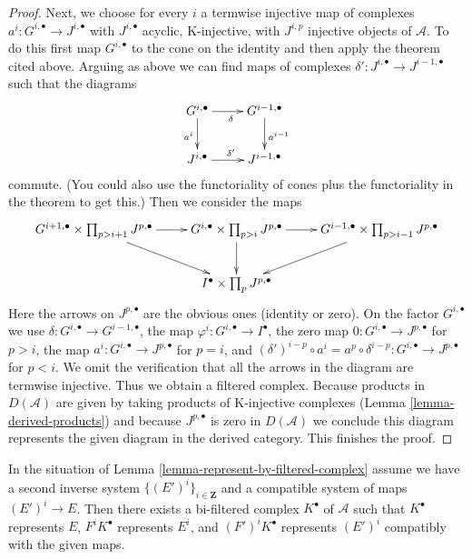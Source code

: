 \begin{proof}
\medskip\noindent
Next, we choose for every $i$ a termwise injective map of complexes
$a^i : G^{i, \bullet} \to J^{i, \bullet}$ with $J^{i, \bullet}$
acyclic, K-injective, with $J^{i, p}$ injective objects of $\mathcal{A}$.
To do this first map $G^{i, \bullet}$ to the cone on the identity
and then apply the theorem cited above.
Arguing as above we can find maps of complexes
$\delta' : J^{i, \bullet} \to J^{i - 1, \bullet}$ such that the diagrams
$$
\xymatrix{
G^{i, \bullet} \ar[r]_\delta \ar[d]_{a^i} &
G^{i - 1, \bullet} \ar[d]^{a^{i - 1}} \\
J^{i, \bullet} \ar[r]^{\delta'} &
J^{i - 1, \bullet}
}
$$
commute. (You could also use the functoriality of cones plus the
functoriality in the theorem to get this.)
Then we consider the maps
$$
\xymatrix{
G^{i + 1, \bullet} \times \prod\nolimits_{p > i + 1} J^{p, \bullet}
\ar[r] \ar[rd] &
G^{i, \bullet} \times \prod\nolimits_{p > i} J^{p, \bullet}
\ar[r] \ar[d] &
G^{i - 1, \bullet} \times \prod\nolimits_{p > i - 1} J^{p, \bullet}
\ar[ld] \\
& I^\bullet \times \prod\nolimits_p J^{p, \bullet}
}
$$
Here the arrows on $J^{p, \bullet}$ are the obvious ones
(identity or zero). On the factor $G^{i, \bullet}$ we use
$\delta : G^{i, \bullet} \to G^{i - 1, \bullet}$, the map
$\varphi^i : G^{i, \bullet} \to I^\bullet$, the zero map
$0 : G^{i, \bullet} \to J^{p, \bullet}$ for $p > i$, the map
$a^i : G^{i, \bullet} \to J^{p, \bullet}$ for $p = i$, and
$(\delta')^{i - p} \circ a^i = a^p \circ \delta^{i - p} :
G^{i, \bullet} \to J^{p, \bullet}$ for $p < i$.
We omit the verification that all the arrows
in the diagram are termwise injective. Thus we obtain a filtered
complex. Because products in $D(\mathcal{A})$ are given by
taking products of K-injective complexes
(Lemma \ref{lemma-derived-products})
and because $J^{p, \bullet}$ is zero in $D(\mathcal{A})$
we conclude this diagram represents the given diagram in the derived
category. This finishes the proof.
\end{proof}

\begin{lemma}
\label{lemma-represent-by-filtered-complex-bis}
In the situation of Lemma \ref{lemma-represent-by-filtered-complex}
assume we have a second inverse system $\{(E')^i\}_{i \in \mathbf{Z}}$
and a compatible system of maps $(E')^i \to E$.
Then there exists a bi-filtered complex $K^\bullet$ of $\mathcal{A}$
such that $K^\bullet$ represents $E$, $F^iK^\bullet$ represents $E^i$,
and $(F')^iK^\bullet$ represents $(E')^i$ compatibly with the given maps.
\end{lemma}

